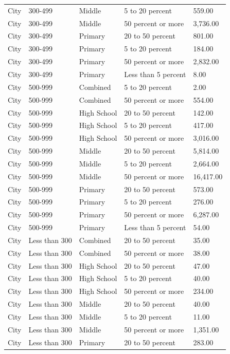 \documentclass[man]{apa6}
\begin{document}
\begin{table}[tbp]
\begin{center}
\begin{threeparttable}
\begin{tabular}{lllll}
City & 300-499 & Middle & 5 to 20 percent & 559.00\\
City & 300-499 & Middle & 50 percent or more & 3,736.00\\
City & 300-499 & Primary & 20 to 50 percent & 801.00\\
City & 300-499 & Primary & 5 to 20 percent & 184.00\\
City & 300-499 & Primary & 50 percent or more & 2,832.00\\
City & 300-499 & Primary & Less than 5 percent & 8.00\\
City & 500-999 & Combined & 5 to 20 percent & 2.00\\
City & 500-999 & Combined & 50 percent or more & 554.00\\
City & 500-999 & High School & 20 to 50 percent & 142.00\\
City & 500-999 & High School & 5 to 20 percent & 417.00\\
City & 500-999 & High School & 50 percent or more & 3,016.00\\
City & 500-999 & Middle & 20 to 50 percent & 5,814.00\\
City & 500-999 & Middle & 5 to 20 percent & 2,664.00\\
City & 500-999 & Middle & 50 percent or more & 16,417.00\\
City & 500-999 & Primary & 20 to 50 percent & 573.00\\
City & 500-999 & Primary & 5 to 20 percent & 276.00\\
City & 500-999 & Primary & 50 percent or more & 6,287.00\\
City & 500-999 & Primary & Less than 5 percent & 54.00\\
City & Less than 300 & Combined & 20 to 50 percent & 35.00\\
City & Less than 300 & Combined & 50 percent or more & 38.00\\
City & Less than 300 & High School & 20 to 50 percent & 47.00\\
City & Less than 300 & High School & 5 to 20 percent & 40.00\\
City & Less than 300 & High School & 50 percent or more & 234.00\\
City & Less than 300 & Middle & 20 to 50 percent & 40.00\\
City & Less than 300 & Middle & 5 to 20 percent & 11.00\\
City & Less than 300 & Middle & 50 percent or more & 1,351.00\\
City & Less than 300 & Primary & 20 to 50 percent & 283.00\\

\end{tabular}
\end{threeparttable}
\end{center}
\end{table}
\end{document}
